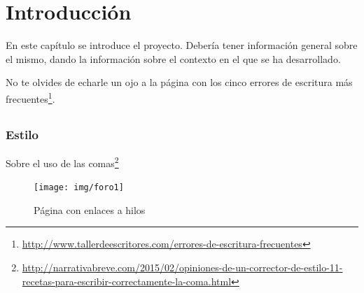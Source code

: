\documentclass[a4paper, 12pt]{book}
\begin{document}
\tableofcontents 
\cleardoublepage
\listoffigures %



\cleardoublepage
\chapter{Introducción}
\label{sec:intro} %

En este capítulo se introduce el proyecto. Debería tener información general sobre 
el mismo, dando la información sobre el contexto en el que se ha desarrollado.

No te olvides de echarle un ojo a la página con los cinco errores de escritura más frecuentes\footnote{\url{http://www.tallerdeescritores.com/errores-de-escritura-frecuentes}}.

\section{}
\label{sec:}

\subsection{Estilo}
\label{subsec:estilo}

Sobre el uso de las comas\footnote{\url{http://narrativabreve.com/2015/02/opiniones-de-un-corrector-de-estilo-11-recetas-para-escribir-correctamente-la-coma.html}}

 \begin{figure}
    \centering
    \texttt{[image: img/foro1]}
    \caption{Página con enlaces a hilos}
    \label{figura:foro_hilos}
 \end{figure}
\end{document}

